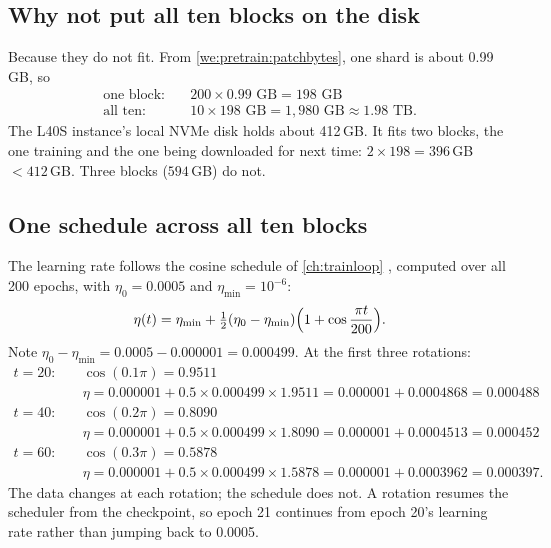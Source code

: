 \subsection{Why not put all ten blocks on the disk}

Because they do not fit. From \cref{we:pretrain:patchbytes}, one shard is about 0.99\,GB, so
\begin{align*}
  \text{one block:}&\quad 200 \times 0.99 \text{ GB} = 198 \text{ GB}\\
  \text{all ten:}&\quad 10 \times 198 \text{ GB} = 1{,}980 \text{ GB} \approx 1.98 \text{ TB.}
\end{align*}
The L40S instance's local NVMe disk holds about 412\,GB. It fits two blocks, the one training and the one being downloaded
for next time: $2 \times 198 = 396$\,GB $< 412$\,GB. Three blocks ($594$\,GB) do not.

\subsection{One schedule across all ten blocks}

The learning rate follows the cosine schedule of \cref{ch:trainloop} \citep{loshchilov2017sgdr}, computed over all 200
epochs, with $\eta_0 = 0.0005$ and $\eta_{\min} = 10^{-6}$:
\begin{equation}\label{eq:pretrain:cosine}
  \eta(t) = \eta_{\min} + \tfrac{1}{2}(\eta_0 - \eta_{\min})\Bigl(1 + \cos\frac{\pi t}{200}\Bigr).
\end{equation}
Note $\eta_0 - \eta_{\min} = 0.0005 - 0.000001 = 0.000499$. At the first three rotations:
\begin{align*}
  t = 20:&\quad \cos(0.1\pi) = 0.9511\\
         &\quad \eta = 0.000001 + 0.5 \times 0.000499 \times 1.9511 = 0.000001 + 0.0004868 = 0.000488\\
  t = 40:&\quad \cos(0.2\pi) = 0.8090\\
         &\quad \eta = 0.000001 + 0.5 \times 0.000499 \times 1.8090 = 0.000001 + 0.0004513 = 0.000452\\
  t = 60:&\quad \cos(0.3\pi) = 0.5878\\
         &\quad \eta = 0.000001 + 0.5 \times 0.000499 \times 1.5878 = 0.000001 + 0.0003962 = 0.000397.
\end{align*}
The data changes at each rotation; the schedule does not. A rotation resumes the scheduler from the checkpoint, so epoch 21
continues from epoch 20's learning rate rather than jumping back to 0.0005.

